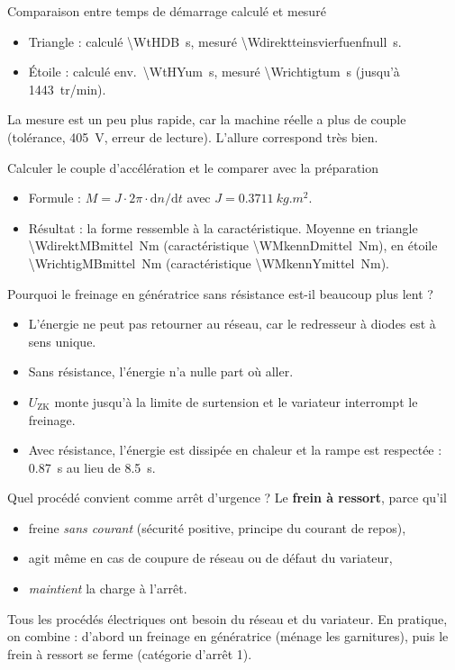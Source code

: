 \documentclass[11pt,a4paper]{article}
\begin{document}
\begin{frage}{Comparaison entre temps de démarrage calculé et mesuré}
\begin{itemize}
\item Triangle : calculé \SI{\WtHDB}{s}, mesuré \SI{\Wdirektteinsvierfuenfnull}{s}.
\item Étoile : calculé env.\ \SI{\WtHYum}{s}, mesuré \SI{\Wrichtigtum}{s} (jusqu'à \SI{1443}{tr/min}).
\end{itemize}
La mesure est un peu plus rapide, car la machine réelle a plus de couple (tolérance, \SI{405}{V},
erreur de lecture). L'allure correspond très bien.
\end{frage}

\begin{frage}{Calculer le couple d'accélération et le comparer avec la préparation}
\begin{itemize}
\item Formule : $M = J\cdot2\pi\cdot\mathrm dn/\mathrm dt$ avec $J = \SI{0,3711}{kg.m^2}$.
\item Résultat : la forme ressemble à la caractéristique. Moyenne en triangle
      \SI{\WdirektMBmittel}{Nm} (caractéristique \SI{\WMkennDmittel}{Nm}), en étoile
      \SI{\WrichtigMBmittel}{Nm} (caractéristique \SI{\WMkennYmittel}{Nm}).
\end{itemize}
\end{frage}

\begin{frage}{Pourquoi le freinage en génératrice sans résistance est-il beaucoup plus lent ?}
\begin{itemize}
\item L'énergie ne peut pas retourner au réseau, car le redresseur à diodes est à sens unique.
\item Sans résistance, l'énergie n'a nulle part où aller.
\item $U_\mathrm{ZK}$ monte jusqu'à la limite de surtension et le variateur interrompt le freinage.
\item Avec résistance, l'énergie est dissipée en chaleur et la rampe est respectée :
      \SI{0,87}{s} au lieu de \SI{8,5}{s}.
\end{itemize}
\end{frage}

\begin{frage}{Quel procédé convient comme arrêt d'urgence ?}
Le \textbf{frein à ressort}, parce qu'il
\begin{itemize}
\item freine \emph{sans courant} (sécurité positive, principe du courant de repos),
\item agit même en cas de coupure de réseau ou de défaut du variateur,
\item \emph{maintient} la charge à l'arrêt.
\end{itemize}
Tous les procédés électriques ont besoin du réseau et du variateur. En pratique, on combine :
d'abord un freinage en génératrice (ménage les garnitures), puis le frein à ressort se ferme
(catégorie d'arrêt 1).
\end{frage}
\end{document}
